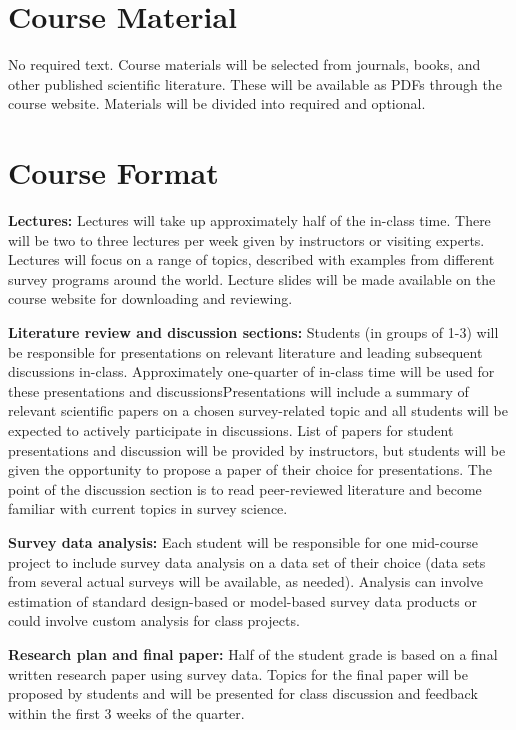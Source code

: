 \documentclass[
  letterpaper,
  oneside,
  open=any]{scrbook}
\begin{document}
\section{Course Material}\label{course-material}

No required text. Course materials will be selected from journals,
books, and other published scientific literature. These will be
available as PDFs through the course website. Materials will be divided
into required and optional.

\section{Course Format}\label{course-format}

\textbf{Lectures:} Lectures will take up approximately half of the
in-class time. There will be two to three lectures per week given by
instructors or visiting experts. Lectures will focus on a range of
topics, described with examples from different survey programs around
the world. Lecture slides will be made available on the course website
for downloading and reviewing.

\textbf{Literature review and discussion sections:} Students (in groups
of 1-3) will be responsible for presentations on relevant literature and
leading subsequent discussions in-class. Approximately one-quarter of
in-class time will be used for these presentations and
discussionsPresentations will include a summary of relevant scientific
papers on a chosen survey-related topic and all students will be
expected to actively participate in discussions. List of papers for
student presentations and discussion will be provided by instructors,
but students will be given the opportunity to propose a paper of their
choice for presentations. The point of the discussion section is to read
peer-reviewed literature and become familiar with current topics in
survey science.

\textbf{Survey data analysis:} Each student will be responsible for one
mid-course project to include survey data analysis on a data set of
their choice (data sets from several actual surveys will be available,
as needed). Analysis can involve estimation of standard design-based or
model-based survey data products or could involve custom analysis for
class projects.

\textbf{Research plan and final paper:} Half of the student grade is
based on a final written research paper using survey data. Topics for
the final paper will be proposed by students and will be presented for
class discussion and feedback within the first 3 weeks of the quarter.
\end{document}
